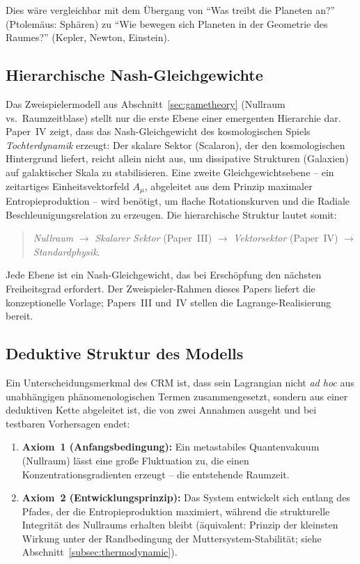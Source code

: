 \documentclass[aps,prd,twocolumn,superscriptaddress,nofootinbib]{revtex4-2}
\begin{document}
Dies wäre vergleichbar mit dem Übergang von ``Was treibt die Planeten an?'' (Ptolemäus: Sphären) zu ``Wie bewegen sich Planeten in der Geometrie des Raumes?'' (Kepler, Newton, Einstein).

\subsection{Hierarchische Nash-Gleichgewichte}
\label{subsec:hierarchical_nash}

Das Zweispielermodell aus Abschnitt~\ref{sec:gametheory} (Nullraum vs.\ Raumzeitblase) stellt nur die erste Ebene einer emergenten Hierarchie dar. Paper~IV \cite{Geiger2026d} zeigt, dass das Nash-Gleichgewicht des kosmologischen Spiels \emph{Tochterdynamik} erzeugt: Der skalare Sektor (Scalaron), der den kosmologischen Hintergrund liefert, reicht allein nicht aus, um dissipative Strukturen (Galaxien) auf galaktischer Skala zu stabilisieren. Eine zweite Gleichgewichtsebene -- ein zeitartiges Einheitsvektorfeld $A_\mu$, abgeleitet aus dem Prinzip maximaler Entropieproduktion -- wird benötigt, um flache Rotationskurven und die Radiale Beschleunigungsrelation zu erzeugen. Die hierarchische Struktur lautet somit:
\begin{quote}
\textit{Nullraum} $\to$ \textit{Skalarer Sektor} (Paper~III) $\to$ \textit{Vektorsektor} (Paper~IV) $\to$ \textit{Standardphysik}.
\end{quote}
Jede Ebene ist ein Nash-Gleichgewicht, das bei Erschöpfung den nächsten Freiheitsgrad erfordert. Der Zweispieler-Rahmen dieses Papers liefert die konzeptionelle Vorlage; Papers~III und~IV stellen die Lagrange-Realisierung bereit.

\subsection{Deduktive Struktur des Modells}
\label{subsec:deductive}

Ein Unterscheidungsmerkmal des CRM ist, dass sein Lagrangian nicht \textit{ad hoc} aus unabhängigen phänomenologischen Termen zusammengesetzt, sondern aus einer deduktiven Kette abgeleitet ist, die von zwei Annahmen ausgeht und bei testbaren Vorhersagen endet:

\begin{enumerate}
\item \textbf{Axiom~1 (Anfangsbedingung):} Ein metastabiles Quantenvakuum (Nullraum) lässt eine große Fluktuation zu, die einen Konzentrationsgradienten erzeugt -- die entstehende Raumzeit.
\item \textbf{Axiom~2 (Entwicklungsprinzip):} Das System entwickelt sich entlang des Pfades, der die Entropieproduktion maximiert, während die strukturelle Integrität des Nullraums erhalten bleibt (äquivalent: Prinzip der kleinsten Wirkung unter der Randbedingung der Muttersystem-Stabilität; siehe Abschnitt~\ref{subsec:thermodynamic}).
\end{enumerate}
\end{document}
